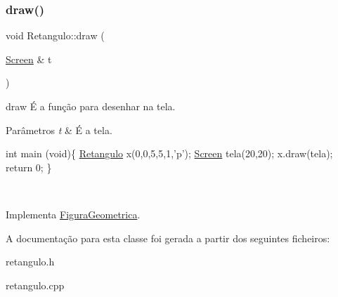 \subsubsection{\texorpdfstring{draw()}{draw()}}
{\footnotesize\ttfamily void Retangulo\+::draw (\begin{DoxyParamCaption}\item[{\mbox{\hyperlink{class_screen}{Screen}} \&}]{t }\end{DoxyParamCaption})\hspace{0.3cm}{\ttfamily [virtual]}}



draw É a função para desenhar na tela. 


\begin{DoxyParams}{Parâmetros}
{\em t} & É a tela. 
\begin{DoxyPre}
int main (void)\{
     \mbox{\hyperlink{class_retangulo}{Retangulo}} x(0,0,5,5,1,'p');
     \mbox{\hyperlink{class_screen}{Screen}} tela(20,20);
     x.draw(tela);
     return 0;
\}
\end{DoxyPre}
 \\
\hline
\end{DoxyParams}


Implementa \mbox{\hyperlink{class_figura_geometrica_a8ee8dedc060b6059a805ea091aef2c41}{Figura\+Geometrica}}.



A documentação para esta classe foi gerada a partir dos seguintes ficheiros\+:\begin{DoxyCompactItemize}
\item 
retangulo.\+h\item 
retangulo.\+cpp\end{DoxyCompactItemize}
